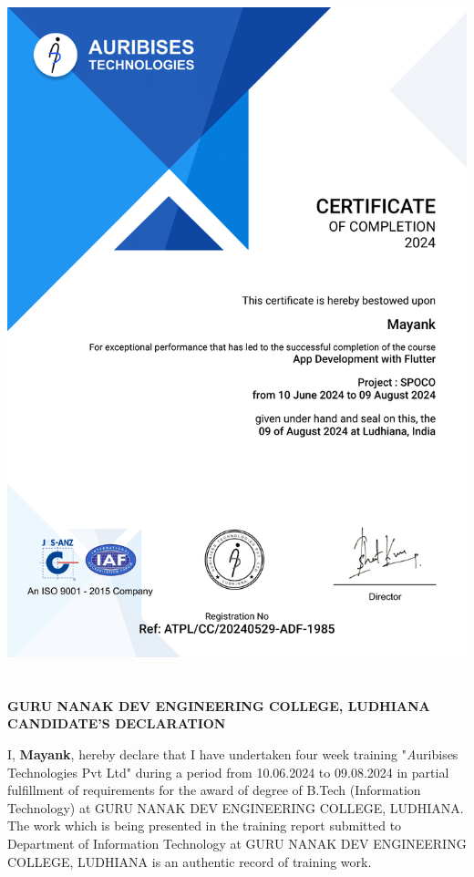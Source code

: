 \documentclass[12pt,a4paper]{report}
\begin{document}
\chapter*{}
\begin{center}
    \includegraphics[width=1\textwidth]{assets/certificate.png}
\end{center}

\newpage

\chapter*{}
\begin{center}
    \textbf{GURU NANAK DEV ENGINEERING COLLEGE, LUDHIANA}\\ \vspace{1cm}
    \textbf{CANDIDATE'S DECLARATION}
\end{center}
\vspace{1cm}
I, \textbf{Mayank}, hereby declare that I have undertaken four week training "\textit Auribises Technologies Pvt Ltd" during a period from {10.06.2024} to {09.08.2024} in partial fulfillment of requirements for the award of degree of B.Tech (Information Technology) at GURU NANAK DEV ENGINEERING COLLEGE, LUDHIANA. The work which is being presented in the training report submitted to Department of Information Technology at GURU NANAK DEV ENGINEERING COLLEGE, LUDHIANA is an authentic record of training work.
\end{document}
